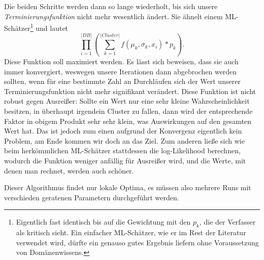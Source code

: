 Die beiden Schritte werden dann so lange wiederholt, bis sich unsere
\textit{Terminierungsfunktion} nicht mehr wesentlich ändert. Sie ähnelt einem
ML-Schätzer\footnote{Eigentlich fast identisch bis auf die Gewichtung mit den
\(p_k\), die der Verfasser als kritisch sieht. Ein einfacher ML-Schätzer, wie er
im Rest der Literatur verwendet wird, dürfte ein genauso gutes Ergebnis liefern 
ohne Voraussetzung von Domänenwissens.}
und lautet
\[ \prod_{i=1}^{|DB|}\left( \sum_{k=1}^{|Cluster|} 
f(\mu_k,\sigma_k,x_i)*p_k \right). \]
Diese Funktion soll maximiert werden. Es lässt sich beweisen, dass sie auch immer
konvergiert, weswegen unsere Iterationen dann abgebrochen werden sollten, 
wenn für eine bestimmte Zahl an Durchläufen sich der Wert unserer
Terminierungsfunktion nicht mehr signifikant verändert. Diese Funktion ist nicht
robust gegen Ausreißer: Sollte ein Wert nur eine sehr kleine Wahrscheinlichkeit besitzen,
in überhaupt irgendein Cluster zu fallen, dann wird der entsprechende Faktor in
obigem Produkt sehr sehr klein, was Auswirkungen auf den gesamten Wert hat. 
Das ist jedoch zum einen aufgrund der Konvergenz eigentlich kein Problem, am
Ende kommen wir doch an das Ziel. Zum anderen ließe sich wie beim 
herkömmlichen ML-Schätzer stattdessen die log-Likelihood berechnen, wodurch
die Funktion weniger anfällig für Ausreißer wird, und die Werte, mit denen man
rechnet, werden auch schöner.

Dieser Algorithmus findet nur lokale Optima, es müssen also mehrere Runs
mit verschieden geratenen Parametern durchgeführt werden.

